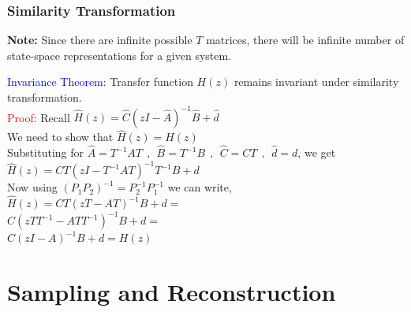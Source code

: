 \documentclass[mathserif, 10pt]{beamer} %
\begin{document}
{

\normalsize

\frametitle{Similarity Transformation}

\textbf{Note:} Since there are infinite possible $T$ matrices, there will be infinite number of state-space representations for a given system. \\ \vspace{.06in}


\textcolor{blue}{Invariance Theorem:} Transfer function $H(z)$ remains invariant under similarity transformation.\\ \vspace{.1in}
\textcolor{red}{Proof:}  Recall $\hat H(z) = \hat C(zI-\hat A)^{-1} \hat B +\hat d$\\ \vspace{.1in}
	We need to show that $\hat H(z) = H(z)$\\ \vspace{.1in}
Substituting for $\hat A = T^{-1}AT~~,~~\hat B = T^{-1}B~~,~~\hat C = CT~~,~~ \hat d=d$, we get\\ \vspace{.06in}
$\hat H(z) = CT(zI-T^{-1}AT)^{-1} T^{-1}B+d$\\
Now using $(P_1P_2)^{-1} = P_2^{-1}P_1^{-1}$ we can write, \\ \vspace{.1in}
$\hat H(z) = CT(zT-AT)^{-1}B+d=$\\
$C(zTT^{-1}-ATT^{-1})^{-1}B+d =$\\
 $C(zI-A)^{-1}B+d = H(z)$



}
\section{Sampling and Reconstruction}
\end{document}
